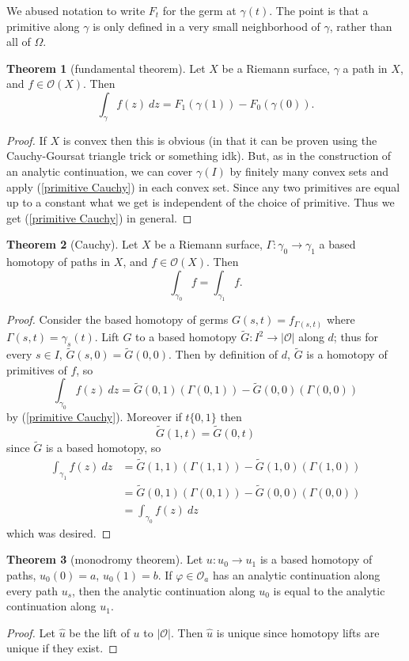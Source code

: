 \documentclass[12pt]{book}
\newcommand{\Olo}{\mathscr O}
\theoremstyle{definition}
\newtheorem{theorem}{Theorem}[chapter]
\begin{document}
We abused notation to write $F_t$ for the germ at $\gamma(t)$.
The point is that a primitive along $\gamma$ is only defined in a very small neighborhood of $\gamma$, rather than all of $\Omega$.

\begin{theorem}[fundamental theorem]
Let $X$ be a Riemann surface, $\gamma$ a path in $X$, and $f \in \Olo(X)$. Then
\begin{equation}
\label{primitive Cauchy}
\int_\gamma f(z) ~dz = F_1(\gamma(1)) - F_0(\gamma(0)).
\end{equation}
\end{theorem}
\begin{proof}
If $X$ is convex then this is obvious (in that it can be proven using the Cauchy-Goursat triangle trick or something idk).
But, as in the construction of an analytic continuation, we can cover $\gamma(I)$ by finitely many convex sets and apply (\ref{primitive Cauchy}) in each convex set.
Since any two primitives are equal up to a constant what we get is independent of the choice of primitive.
Thus we get (\ref{primitive Cauchy}) in general.
\end{proof}

\begin{theorem}[Cauchy]
Let $X$ be a Riemann surface, $\Gamma: \gamma_0 \to \gamma_1$ a based homotopy of paths in $X$, and $f \in \Olo(X)$. Then
$$\int_{\gamma_0} f = \int_{\gamma_1} f.$$
\end{theorem}
\begin{proof}
Consider the based homotopy of germs $G(s, t) = f_{\Gamma(s, t)}$ where $\Gamma(s, t) = \gamma_s(t)$.
Lift $G$ to a based homotopy $\tilde G: I^2 \to |\Olo|$ along $d$; thus for every $s \in I$, $\tilde G(s, 0) = \tilde G(0, 0)$.
Then by definition of $d$, $\tilde G$ is a homotopy of primitives of $f$, so
$$\int_{\gamma_0} f(z) ~dz = \tilde G(0, 1)(\Gamma(0, 1)) - \tilde G(0, 0)(\Gamma(0, 0))$$
by (\ref{primitive Cauchy}).
Moreover if $t \{0, 1\}$ then
$$\tilde G(1, t) = \tilde G(0, t)$$
since $\tilde G$ is a based homotopy, so
\begin{align*}\int_{\gamma_1} f(z) ~dz &= \tilde G(1, 1)(\Gamma(1, 1)) - \tilde G(1, 0)(\Gamma(1, 0))\\
&= \tilde G(0, 1)(\Gamma(0, 1)) - \tilde G(0, 0)(\Gamma(0, 0))\\
&= \int_{\gamma_0} f(z) ~dz
\end{align*}
which was desired.
\end{proof}

\begin{theorem}[monodromy theorem]
Let $u: u_0 \to u_1$ is a based homotopy of paths, $u_0(0) = a$, $u_0(1) = b$.
If $\varphi \in \Olo_a$ has an analytic continuation along every path $u_s$, then the analytic continuation along $u_0$ is equal to the analytic continuation along $u_1$.
\end{theorem}
\begin{proof}
Let $\hat u$ be the lift of $u$ to $|\Olo|$.
Then $\hat u$ is unique since homotopy lifts are unique if they exist.
\end{proof}
\end{document}
